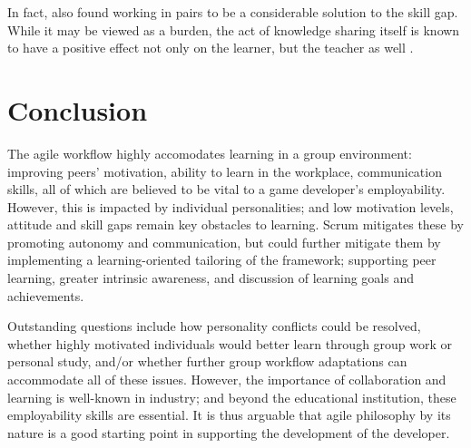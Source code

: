 \documentclass{scrartcl}
\begin{document}
In fact, \cite{group2005} also found working in pairs to be a considerable solution to the skill gap. While it may be viewed as a burden, the act of knowledge sharing itself is known to have a positive effect not only on the learner, but the teacher as well \cite{activepassive, motivation}. 

\section{Conclusion}
The agile workflow highly accomodates learning in a group environment: improving peers' motivation, ability to learn in the workplace, communication skills, all of which are believed to be vital to a game developer's employability. However, this is impacted by individual personalities; and low motivation levels, attitude and skill gaps remain key obstacles to learning. Scrum mitigates these by promoting autonomy and communication, but could further mitigate them by implementing a learning-oriented tailoring of the framework; supporting peer learning, greater intrinsic awareness, and discussion of learning goals and achievements.

Outstanding questions include how personality conflicts could be resolved, whether highly motivated individuals would better learn through group work or personal study, and/or whether further group workflow adaptations can accommodate all of these issues. However, the importance of collaboration and learning is well-known in industry; and beyond the educational institution, these employability skills are essential. It is thus arguable that agile philosophy by its nature is a good starting point in supporting the development of the developer.


 

\end{document}
